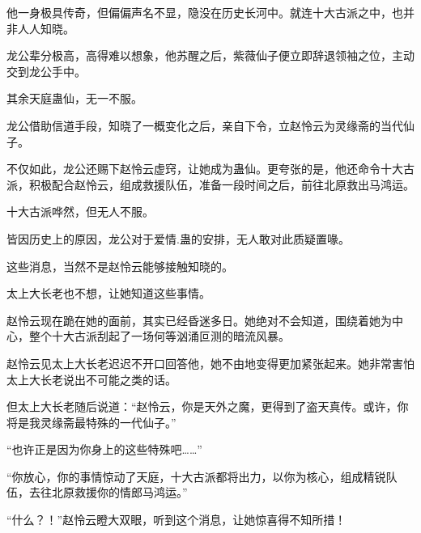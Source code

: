 \begin{this_body}
他一身极具传奇，但偏偏声名不显，隐没在历史长河中。就连十大古派之中，也并非人人知晓。

龙公辈分极高，高得难以想象，他苏醒之后，紫薇仙子便立即辞退领袖之位，主动交到龙公手中。

其余天庭蛊仙，无一不服。

龙公借助信道手段，知晓了一概变化之后，亲自下令，立赵怜云为灵缘斋的当代仙子。

不仅如此，龙公还赐下赵怜云虚窍，让她成为蛊仙。更夸张的是，他还命令十大古派，积极配合赵怜云，组成救援队伍，准备一段时间之后，前往北原救出马鸿运。

十大古派哗然，但无人不服。

皆因历史上的原因，龙公对于爱情.蛊的安排，无人敢对此质疑置喙。

这些消息，当然不是赵怜云能够接触知晓的。

太上大长老也不想，让她知道这些事情。

赵怜云现在跪在她的面前，其实已经昏迷多日。她绝对不会知道，围绕着她为中心，整个十大古派刮起了一场何等汹涌叵测的暗流风暴。

赵怜云见太上大长老迟迟不开口回答他，她不由地变得更加紧张起来。她非常害怕太上大长老说出不可能之类的话。

但太上大长老随后说道：“赵怜云，你是天外之魔，更得到了盗天真传。或许，你将是我灵缘斋最特殊的一代仙子。”

“也许正是因为你身上的这些特殊吧……”

“你放心，你的事情惊动了天庭，十大古派都将出力，以你为核心，组成精锐队伍，去往北原救援你的情郎马鸿运。”

“什么？！”赵怜云瞪大双眼，听到这个消息，让她惊喜得不知所措！

\end{this_body}

